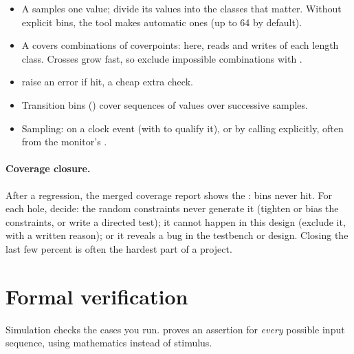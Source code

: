 \begin{itemize}
  \item A  samples one value;  divide its values into the classes that matter. Without explicit bins, the tool makes automatic ones (up to 64 by default).
  \item A  covers combinations of coverpoints: here, reads and writes of each length class. Crosses grow fast, so exclude impossible combinations with .
  \item {} raise an error if hit, a cheap extra check.
  \item Transition bins () cover sequences of values over successive samples.
  \item Sampling: on a clock event (with  to qualify it), or by calling  explicitly, often from the monitor's .
\end{itemize}

\paragraph{Coverage closure.} After a regression, the merged coverage report shows the : bins never hit. For each hole, decide: the random constraints never generate it (tighten or bias the constraints, or write a directed test); it cannot happen in this design (exclude it, with a written reason); or it reveals a bug in the testbench or design. Closing the last few percent is often the hardest part of a project.

\section{Formal verification}

Simulation checks the cases you run.  proves an assertion for \emph{every} possible input sequence, using mathematics instead of stimulus.

